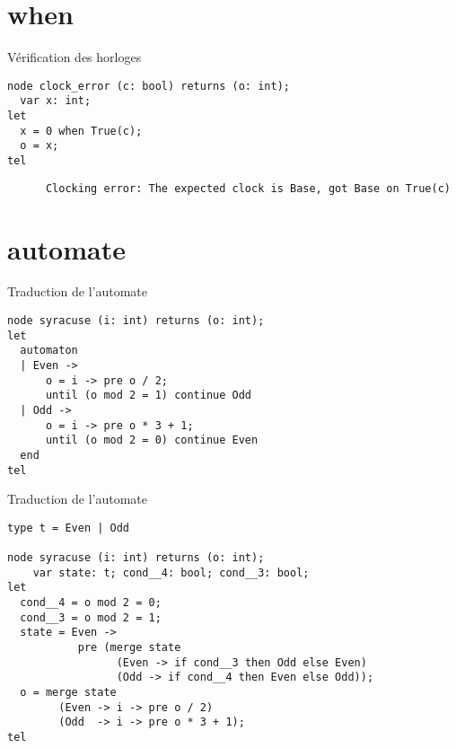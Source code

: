 \documentclass{beamer}
\begin{document}

\section{when}

\begin{frame}[fragile]{Vérification des horloges}

\begin{lstlisting}
node clock_error (c: bool) returns (o: int);
  var x: int;
let
  x = 0 when True(c);
  o = x;
tel
\end{lstlisting}

 {
     \scriptsize \color{red!80}
     \begin{verbatim}
      Clocking error: The expected clock is Base, got Base on True(c)
     \end{verbatim}
}


\end{frame}


\section{automate}

\begin{frame}[fragile]{Traduction de l'automate}

\begin{lstlisting}
node syracuse (i: int) returns (o: int);
let
  automaton
  | Even ->
      o = i -> pre o / 2;
      until (o mod 2 = 1) continue Odd
  | Odd ->
      o = i -> pre o * 3 + 1;
      until (o mod 2 = 0) continue Even
  end
tel
\end{lstlisting}

\end{frame}

\begin{frame}[fragile]{Traduction de l'automate}

\begin{lstlisting}
type t = Even | Odd

node syracuse (i: int) returns (o: int);
    var state: t; cond__4: bool; cond__3: bool;
let
  cond__4 = o mod 2 = 0;
  cond__3 = o mod 2 = 1;
  state = Even ->
           pre (merge state
                 (Even -> if cond__3 then Odd else Even)
                 (Odd -> if cond__4 then Even else Odd));
  o = merge state
        (Even -> i -> pre o / 2)
        (Odd  -> i -> pre o * 3 + 1);
tel
\end{lstlisting}

\end{frame}
\end{document}
